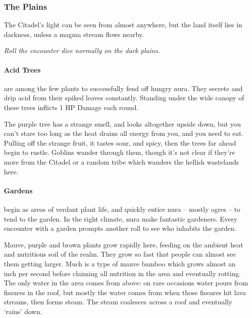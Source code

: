 \begin{multicols}{2}
\subsubsection{The Plains}

The Citadel's light can be seen from almost anywhere, but the land itself lies in darkness, unless a magma stream flows nearby.

\textit{Roll the encounter dice normally on the dark plains.}

\paragraph{Acid Trees}
are among the few plants to successfully fend off hungry nura.
They secrete and drip acid from their spiked leaves constantly.
Standing under the wide canopy of these trees inflicts 1 HP Damage each round.

\begin{boxtext}

  The purple tree has a strange smell, and looks altogether upside down, but you can't stare too long as the heat drains all energy from you, and you need to eat.
Pulling off the strange fruit, it tastes sour, and spicy, then the trees far ahead begin to rustle.
Goblins wander through them, though it's not clear if they're more from the Citadel or a random tribe which wanders the hellish wastelands here.

\end{boxtext}

\paragraph{Gardens}
begin as areas of verdant plant life, and quickly entice nura -- mostly ogres -- to tend to the garden.
In the right climate, nura make fantastic gardeners.
Every encounter with a garden prompts another roll to see who inhabits the garden.

Mauve, purple and brown plants grow rapidly here, feeding on the ambient heat and nutritious soil of the realm.
They grow so fast that people can almost see them getting larger.
Much is a type of mauve bamboo which grows almost an inch per second before claiming all nutrition in the area and eventually rotting.
The only water in the area comes from above: on rare occasions water pours from fissures in the roof, but mostly the water comes from when those fissures hit lava streams, then forms steam.
The steam coalesces across a roof and eventually `rains' down.


\end{multicols}
